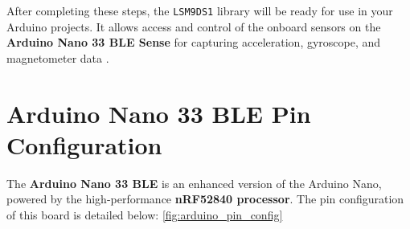 After completing these steps, the \texttt{LSM9DS1} library will be ready for use in your Arduino projects. It allows access and control of the onboard sensors on the \textbf{Arduino Nano 33 BLE Sense } for capturing acceleration, gyroscope, and magnetometer data \cite{Arduino:2024h}.








\newpage
\section{Arduino Nano 33 BLE Pin Configuration}

The \textbf{Arduino Nano 33 BLE} is an enhanced version of the Arduino Nano, powered by the high-performance \textbf{nRF52840 processor}. The pin configuration of this board is detailed below:  \ref{fig:arduino_pin_config} \\
\vspace{1em} 

